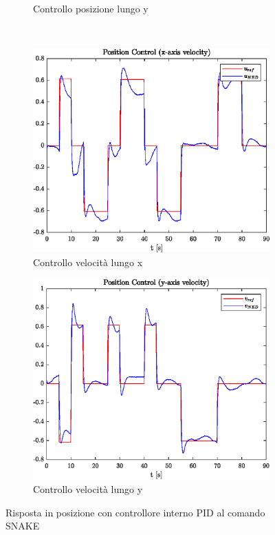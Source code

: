 \begin{figure}
\begin{subfigure}{0.45\textwidth}
		\caption{Controllo posizione lungo y}
	\end{subfigure}
	\\
	\begin{subfigure}{0.45\textwidth}
		\centering
		\includegraphics[width=1\textwidth]{Simulazioni/Figure/PID/SNAKE/PositionControlXVel}
		\caption{Controllo velocità lungo x}
	\end{subfigure}
	\hfill
	\begin{subfigure}{0.45\textwidth}
		\centering
		\includegraphics[width=1\textwidth]{Simulazioni/Figure/PID/SNAKE/PositionControlYVel}
		\caption{Controllo velocità lungo y}
	\end{subfigure}
	\caption{Risposta in posizione con controllore interno PID al comando SNAKE}
\end{figure}

